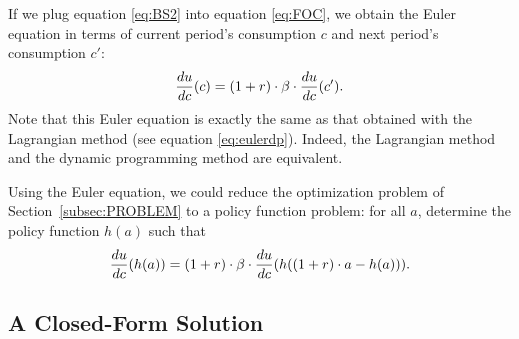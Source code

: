 \documentclass[letterpaper,12pt,leqno]{article}
\begin{document}
If we plug equation \eqref{eq:BS2} into equation \eqref{eq:FOC}, we obtain the Euler equation in terms of current period's consumption $c$ and next period's consumption $c'$:
\begin{equation}
\frac{d u}{d c}(c)=(1+r)\cdot \beta \cdot \frac{d u}{d c}(c')\label{Euler}.
\end{equation}
Note that this Euler equation is exactly the same as that obtained with the Lagrangian method (see equation \eqref{eq:eulerdp}). Indeed, the Lagrangian method and the dynamic programming method are equivalent.

Using the Euler equation, we could reduce the optimization problem of Section~\ref{subsec:PROBLEM} to a policy function problem: for all $a$, determine the policy function $h(a)$ such that
\begin{equation*}
\frac{d u}{d c}(h(a))=(1+r)\cdot \beta \cdot  \frac{d u}{d c}(h((1+r)\cdot a-h(a))).
\end{equation*}

\subsection{A Closed-Form Solution}\label{guess}
\end{document}
